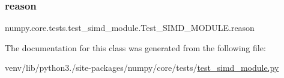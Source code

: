 \subsubsection{\texorpdfstring{reason}{reason}}
{\footnotesize\ttfamily numpy.\+core.\+tests.\+test\+\_\+simd\+\_\+module.\+Test\+\_\+\+S\+I\+M\+D\+\_\+\+M\+O\+D\+U\+L\+E.\+reason\hspace{0.3cm}{\ttfamily [static]}}



The documentation for this class was generated from the following file\+:\begin{DoxyCompactItemize}
\item 
venv/lib/python3./site-\/packages/numpy/core/tests/\hyperlink{test__simd__module_8py}{test\+\_\+simd\+\_\+module.\+py}\end{DoxyCompactItemize}
